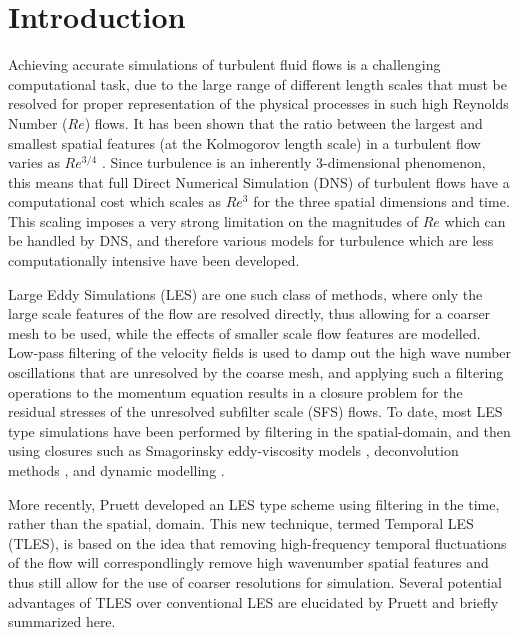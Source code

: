 \chapter{Introduction}


Achieving accurate simulations of turbulent fluid flows is a challenging computational task, due to the large range of different length scales that must be resolved for proper representation of the physical processes in such high Reynolds Number ($Re$) flows. It has been shown that the ratio between the largest and smallest spatial features (at the Kolmogorov length scale) in a turbulent flow varies as $Re^{3/4}$ \cite{Pruett2008}. Since turbulence is an inherently 3-dimensional phenomenon, this means that full Direct Numerical Simulation (DNS) of turbulent flows have a computational cost which scales as $Re^3$ for the three spatial dimensions and time. This scaling imposes a very strong limitation on the magnitudes of $Re$ which can be handled by DNS, and therefore various models for turbulence which are less computationally intensive have been developed.

Large Eddy Simulations (LES) are one such class of methods, where only the large scale features of the flow are resolved directly, thus allowing for a coarser mesh to be used, while the effects of smaller scale flow features are modelled. Low-pass filtering of the velocity fields is used to damp out the high wave number oscillations that are unresolved by the coarse mesh, and applying such a filtering operations to the momentum equation results in a closure problem for the residual stresses of the unresolved subfilter scale (SFS) flows. To date, most LES type simulations have been performed by filtering in the spatial-domain, and then using closures such as Smagorinsky eddy-viscosity models \cite{Smagorinsky1963}, deconvolution methods \cite{Stolz1999}, and dynamic modelling \cite{Germano1991}.

More recently, Pruett \cite{Pruett2000} developed an LES type scheme using filtering in the time, rather than the spatial, domain. This new technique, termed Temporal LES (TLES), is based on the idea that removing high-frequency temporal fluctuations of the flow will correspondlingly remove high wavenumber spatial features and thus still allow for the use of coarser resolutions for simulation. Several potential advantages of TLES over conventional LES are elucidated by Pruett \cite{Pruett2008} and briefly summarized here.

